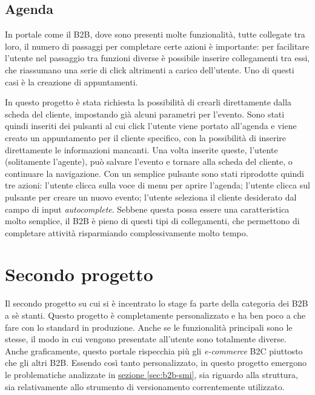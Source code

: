 \subsection{Agenda}
In portale come il B2B, dove sono presenti molte funzionalità, tutte collegate tra loro, il numero di passaggi per completare certe azioni è importante: per facilitare l'utente nel passaggio tra funzioni diverse è possibile inserire collegamenti tra essi, che riassumano una serie di click altrimenti a carico dell'utente. Uno di questi casi è la creazione di appuntamenti.

In questo progetto è stata richiesta la possibilità di crearli direttamente dalla scheda del cliente, impostando già alcuni parametri per l'evento. Sono stati quindi inseriti dei pulsanti al cui click l'utente viene portato all'agenda e viene creato un appuntamento per il cliente specifico, con la possibilità di inserire direttamente le informazioni mancanti. Una volta inserite queste, l'utente (solitamente l'agente), può salvare l'evento e tornare alla scheda del cliente, o continuare la navigazione. Con un semplice pulsante sono stati riprodotte quindi tre azioni: l'utente clicca sulla voce di menu per aprire l'agenda; l'utente clicca sul pulsante per creare un nuovo evento; l'utente seleziona il cliente desiderato dal campo di input \textit{autocomplete}. Sebbene questa possa essere una caratteristica molto semplice, il B2B è pieno di questi tipi di collegamenti, che permettono di completare attività risparmiando complessivamente molto tempo.

\section{Secondo progetto}
Il secondo progetto su cui si è incentrato lo stage fa parte della categoria dei B2B a sè stanti. Questo progetto è completamente personalizzato e ha ben poco a che fare con lo standard in produzione. Anche se le funzionalità principali sono le stesse, il modo in cui vengono presentate all'utente sono totalmente diverse. Anche graficamente, questo portale rispecchia più gli \textit{e-commerce} B2C piuttosto che gli altri B2B. Essendo così tanto personalizzato, in questo progetto emergono le problematiche analizzate in \hyperref[sec:b2b-smi]{sezione \ref{sec:b2b-smi}}, sia riguardo alla struttura, sia relativamente allo strumento di versionamento correntemente utilizzato.

